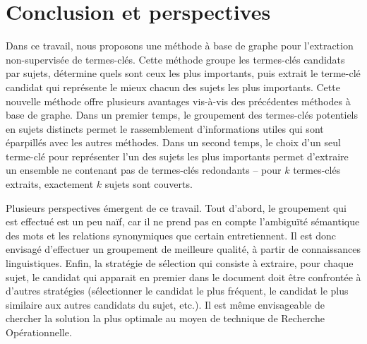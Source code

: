 \section{Conclusion et perspectives}
\label{sec:conclusion_et_perspectives}
  Dans ce travail, nous proposons une méthode à base de graphe pour
  l'extraction non-supervisée de termes-clés. Cette méthode groupe les
  termes-clés candidats par sujets, détermine quels sont ceux les plus
  importants, puis extrait le terme-clé candidat qui représente le mieux chacun
  des sujets les plus importants. Cette nouvelle méthode offre plusieurs
  avantages vis-à-vis des précédentes méthodes à base de graphe. Dans un premier
  temps, le groupement des termes-clés potentiels en sujets distincts permet le
  rassemblement d'informations utiles qui sont éparpillés avec les autres
  méthodes. Dans un second temps, le choix d'un seul terme-clé pour représenter
  l'un des sujets les plus importants permet d'extraire un ensemble ne contenant
  pas de termes-clés redondants -- pour $k$ termes-clés extraits, exactement $k$
  sujets sont couverts.

  Plusieurs perspectives émergent de ce travail. Tout d'abord, le groupement
  qui est effectué est un peu naïf, car il ne prend pas en compte l'ambiguïté
  sémantique des mots et les relations synonymiques que certain entretiennent.
  Il est donc envisagé d'effectuer un groupement de meilleure qualité, à partir
  de connaissances linguistiques. Enfin, la stratégie de sélection qui consiste
  à extraire, pour chaque sujet, le candidat qui apparait en premier dans le
  document doit être confrontée à d'autres stratégies (sélectionner le candidat
  le plus fréquent, le candidat le plus similaire aux autres candidats du sujet,
  etc.). Il est même envisageable de chercher la solution la plus optimale au
  moyen de technique de Recherche Opérationnelle.

